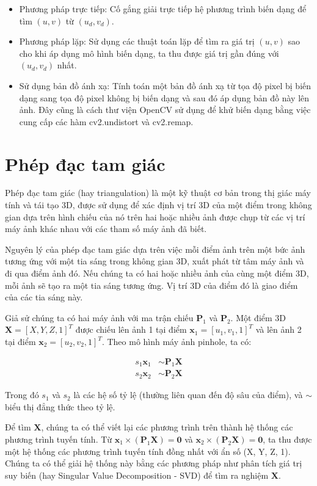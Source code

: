 \begin{itemize}
\item Phương pháp trực tiếp: Cố gắng giải trực tiếp hệ phương trình biến dạng để tìm $(u, v)$ từ $(u_d, v_d)$.
\item Phương pháp lặp: Sử dụng các thuật toán lặp để tìm ra giá trị $(u, v)$ sao cho khi áp dụng mô hình biến dạng, ta thu được giá trị gần đúng với $(u_d, v_d)$ nhất.
\item Sử dụng bản đồ ánh xạ: Tính toán một bản đồ ánh xạ từ tọa độ pixel bị biến dạng sang tọa độ pixel không bị biến dạng và sau đó áp dụng bản đồ này lên ảnh. Đây cũng là cách thư viện OpenCV sử dụng để khử biến dạng bằng việc cung cấp các hàm cv2.undistort và cv2.remap.
\end{itemize}

\section{Phép đạc tam giác}

Phép đạc tam giác (hay triangulation) là một kỹ thuật cơ bản trong thị giác máy tính và tái tạo 3D, được sử dụng để xác định vị trí 3D của một điểm trong không gian dựa trên hình chiếu của nó trên hai hoặc nhiều ảnh được chụp từ các vị trí máy ảnh khác nhau với các tham số máy ảnh đã biết. 

Nguyên lý của phép đạc tam giác dựa trên việc mỗi điểm ảnh trên một bức ảnh tương ứng với một tia sáng trong không gian 3D, xuất phát từ tâm máy ảnh và đi qua điểm ảnh đó. Nếu chúng ta có hai hoặc nhiều ảnh của cùng một điểm 3D, mỗi ảnh sẽ tạo ra một tia sáng tương ứng. Vị trí 3D của điểm đó là giao điểm của các tia sáng này. 

Giả sử chúng ta có hai máy ảnh với ma trận chiếu $\mathbf{P}_1$ và $\mathbf{P}_2$. Một điểm 3D $\mathbf{X} = [X, Y, Z, 1]^T$ được chiếu lên ảnh 1 tại điểm $\mathbf{x}_1 = [u_1, v_1, 1]^T$ và lên ảnh 2 tại điểm $\mathbf{x}_2 = [u_2, v_2, 1]^T$. Theo mô hình máy ảnh pinhole, ta có:


\begin{equation} \label{eq:your_label_here} %
\begin{aligned}
    s_1 \mathbf{x}_1 &\sim \mathbf{P}_1 \mathbf{X} \\
    s_2 \mathbf{x}_2 &\sim \mathbf{P}_2 \mathbf{X}
\end{aligned}
\end{equation}


Trong đó $s_1$ và $s_2$ là các hệ số tỷ lệ (thường liên quan đến độ sâu của điểm), và $\sim$ biểu thị đẳng thức theo tỷ lệ.

Để tìm $\mathbf{X}$, chúng ta có thể viết lại các phương trình trên thành hệ thống các phương trình tuyến tính. Từ $\mathbf{x}_1 \times (\mathbf{P}_1 \mathbf{X}) = \mathbf{0}$ và $\mathbf{x}_2 \times (\mathbf{P}_2 \mathbf{X}) = \mathbf{0}$, ta thu được một hệ thống các phương trình tuyến tính đồng nhất với ẩn số (X, Y, Z, 1). Chúng ta có thể giải hệ thống này bằng các phương pháp như phân tích giá trị suy biến (hay Singular Value Decomposition - SVD) để tìm ra nghiệm $\mathbf{X}$.   

